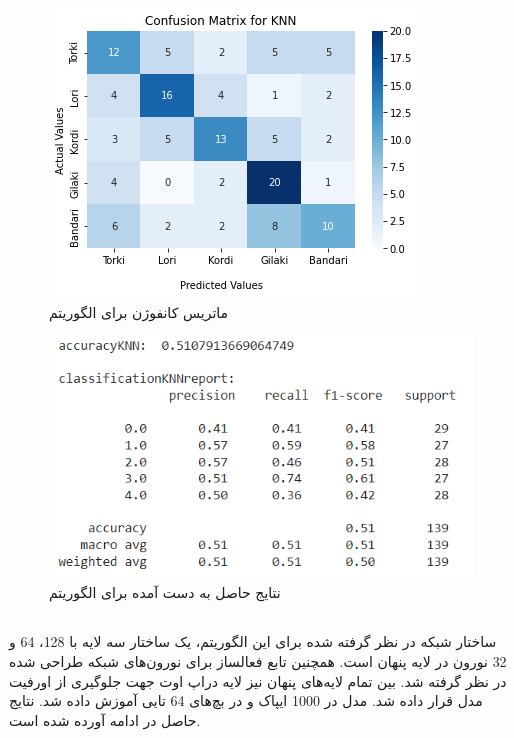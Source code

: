 \begin{figure}[h!]
	\centering
	\includegraphics[width=1\linewidth]{images/knn_confusion_matrix.png}
	\caption{ماتریس کانفوژن برای الگوریتم }
	\label{fig:knn_confusion_matrix}
\end{figure}

\newpage

\begin{figure}[h!]
	\centering
	\includegraphics[width=1\linewidth]{images/knn_scores.PNG}
	\caption{نتایج حاصل به دست آمده برای الگوریتم }
	\label{fig:knn_scores}
\end{figure}

\newpage

\subsection{}
ساختار شبکه در نظر گرفته شده برای این الگوریتم، یک ساختار سه لایه با 128، 64 و 32 نورون در لایه پنهان است. همچنین تابع فعالساز 
 برای نورون‌های شبکه طراحی شده در نظر گرفته شد.
بین تمام لایه‌های پنهان نیز لایه دراپ اوت جهت جلوگیری از اورفیت مدل قرار داده شد. مدل در 1000 ایپاک و در بچ‌های 64 تایی آموزش داده شد.
نتایج حاصل در ادامه آورده شده است.

